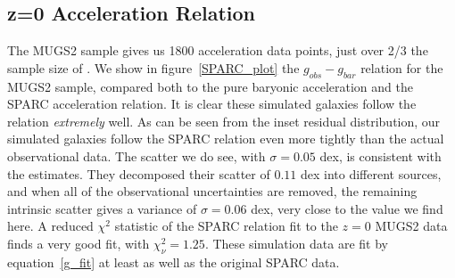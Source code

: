 \subsection{z=0 Acceleration Relation}
The MUGS2 sample gives us 1800 acceleration data points, just over 2/3 the
sample size of \citet{McGaugh2016}. We show in figure~\ref{SPARC_plot} the
$g_{obs}-g_{bar}$ relation for the MUGS2 sample, compared both to the pure
baryonic acceleration and the SPARC acceleration relation.  It is clear these
simulated galaxies follow the \citet{McGaugh2016} relation {\it extremely} well.
As can be seen from the inset residual distribution, our simulated galaxies
follow the SPARC relation even more tightly than the actual observational data.
The scatter we do see, with $\sigma=0.05$ dex, is consistent with the
\citet{McGaugh2016} estimates.  They decomposed their scatter of $0.11$
dex into different sources, and when all of the observational uncertainties are
removed, the remaining intrinsic scatter gives a variance of $\sigma=0.06$ dex,
very close to the value we find here.  A reduced $\chi^2$ statistic of the SPARC
relation fit to the $z=0$ MUGS2 data finds a very good fit, with $\chi^2_\nu =
1.25$.  These simulation data are fit by equation~\ref{g_fit} at least as well
as the original SPARC data.

